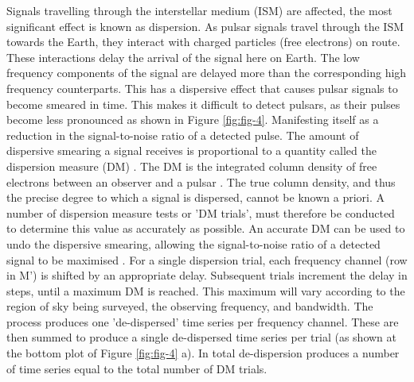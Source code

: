 Signals travelling through the interstellar medium (ISM) are affected, the most significant effect is known as dispersion. As pulsar signals travel through the ISM towards the Earth, they interact with charged particles (free electrons) on route. These interactions delay the arrival of the signal here on Earth. The low frequency components of the signal are delayed more than the corresponding high frequency counterparts. This has a dispersive effect that causes pulsar signals to become smeared in time. This makes it difficult to detect pulsars, as their pulses become less pronounced as shown in Figure \ref{fig:fig-4}. Manifesting itself as a reduction in the signal-to-noise ratio of a detected pulse. The amount of dispersive smearing a signal receives is proportional to a quantity called the dispersion measure (DM) \citep{lorimer}. The DM is the integrated column density of free electrons between an observer and a pulsar \citep{lorimer2008}. The true column density, and thus the precise degree to which a signal is dispersed, cannot be known a priori. A number of dispersion measure tests or 'DM trials', must therefore be conducted to determine this value as accurately as possible. An accurate DM can be used to undo the dispersive smearing, allowing the signal-to-noise ratio of a detected signal to be maximised \citep{lorimer}. For a single dispersion trial, each frequency channel (row in M') is shifted by an appropriate delay. Subsequent trials increment the delay in steps, until a maximum DM is reached. This maximum will vary according to the region of sky being surveyed, the observing frequency, and bandwidth. The process produces one 'de-dispersed' time series per frequency channel. These are then summed to produce a single de-dispersed time series per trial (as shown at the bottom plot of Figure \ref{fig:fig-4} a). In total de-dispersion produces a number of time series equal to the total number of DM trials.

